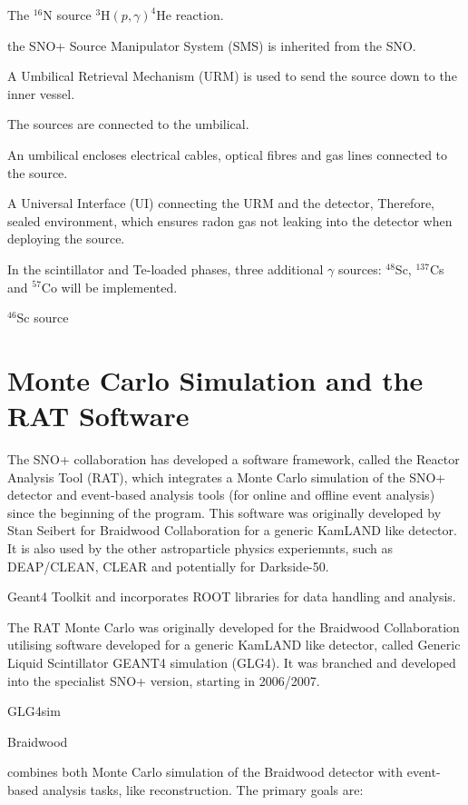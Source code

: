 The $^{16}$N source
$^{3}$H$(p,\gamma)^{4}$He reaction.

the SNO+ Source Manipulator System (SMS)
is inherited from the SNO.

A Umbilical Retrieval Mechanism (URM) is used to send the source down to the inner vessel.

The sources are connected to the umbilical.

An umbilical encloses electrical cables, optical fibres and gas lines connected to the source.

A Universal Interface (UI) connecting the URM and the detector, 
Therefore, sealed environment, which 
ensures radon gas not leaking into the detector when deploying the source.


In the scintillator and Te-loaded phases, three additional $\gamma$ sources: $^{48}$Sc, $^{137}$Cs and $^{57}$Co will be implemented.

$^{46}$Sc source

\section{Monte Carlo Simulation and the RAT Software}
The SNO+ collaboration has developed a software framework, called the Reactor Analysis
Tool (RAT), which integrates a Monte Carlo simulation of the SNO+ detector and event-based analysis tools (for online and offline event analysis) since the beginning of the program. This software was originally developed by Stan Seibert for Braidwood Collaboration for a generic KamLAND like detector. It is also used by the other astroparticle physics experiemnts, such as DEAP/CLEAN, CLEAR and potentially for Darkside-50\cite{rat}.

Geant4 Toolkit and
incorporates ROOT libraries for data handling and analysis.

The RAT Monte Carlo was originally developed for the Braidwood Collaboration
utilising software developed for a generic KamLAND like detector, called Generic Liquid Scintillator GEANT4 simulation (GLG4). It was branched and
developed into the specialist SNO+ version, starting in 2006/2007.

GLG4sim


Braidwood

combines both Monte Carlo simulation of the Braidwood detector with event-based analysis tasks, like reconstruction. The primary goals are:

